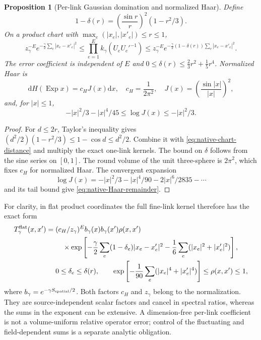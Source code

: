 \documentclass[11pt,oneside,openany]{book}
\newtheorem{proposition}[proposition]{Proposition}
\theoremstyle{definition}
\theoremstyle{remark}
\newcommand{\dd}{\mathrm d}
\begin{document}
\begin{proposition}[Per-link Gaussian domination and normalized Haar]
\label{prop:native-supnorm-kernel}
Define
\[
 1-\delta(r)=\left(\frac{\sin r}{r}\right)^2(1-r^2/3).
\]
On a product chart with $\max_e(|x_e|,|x'_e|)\le r\le1$,
\begin{equation}
 z_\gamma^{-E}e^{-\frac\gamma2\sum_e|x_e-x'_e|^2}
 \le\prod_{e=1}^E k_\gamma(U_eU_e'^{-1})
 \le z_\gamma^{-E}
            e^{-\frac\gamma2(1-\delta(r))\sum_e|x_e-x'_e|^2}.
 \label{eq:native-supnorm-sandwich}
\end{equation}
The error coefficient is independent of $E$ and
$0\le\delta(r)\le\tfrac23r^2+\tfrac15r^4$. Normalized Haar is
\begin{equation}
 \dd H(\operatorname{Exp}x)=c_HJ(x)\dd x,\quad
 c_H=\frac1{2\pi^2},\quad
 J(x)=\left(\frac{\sin|x|}{|x|}\right)^2,
 \label{eq:native-normalized-Haar}
\end{equation}
and, for $|x|\le1$,
\begin{equation}
 -|x|^2/3-|x|^4/45\le\log J(x)\le-|x|^2/3.
 \label{eq:native-Haar-remainder}
\end{equation}
\end{proposition}
\begin{proof}
For $d\le2r$, Taylor's inequality gives
$(d^2/2)(1-r^2/3)\le1-\cos d\le d^2/2$.
Combine it with \cref{eq:native-chart-distance} and multiply the exact
one-link kernels. The bound on $\delta$ follows from the sine series
on $[0,1]$. The round volume of the unit three-sphere is $2\pi^2$,
which fixes $c_H$ for normalized Haar. The convergent expansion
\[
 \log J(x)=-|x|^2/3-|x|^4/90-2|x|^6/2835-\cdots
\]
and its tail bound give \cref{eq:native-Haar-remainder}.
\end{proof}

For clarity, in flat product coordinates the full fine-link kernel
therefore has the exact form
\begin{align}
 T_\gamma^{\rm flat}(x,x')
 ={}&(c_H/z_\gamma)^E b_\gamma(x)b_\gamma(x')\rho(x,x')\notag\\
 &\quad\times\exp\left[-\frac\gamma2\sum_e(1-\delta_e)|x_e-x'_e|^2
                     -\frac16\sum_e(|x_e|^2+|x'_e|^2)\right],\notag\\
 &0\le\delta_e\le\delta(r),\qquad
 \exp\left[-\frac1{90}\sum_e(|x_e|^4+|x'_e|^4)\right]
                      \le\rho(x,x')\le1,
 \label{eq:native-flat-factorization}
\end{align}
where $b_\gamma=e^{-\gamma S_{\rm spatial}/2}$. Both factors
$c_H$ and $z_\gamma$ belong to the normalization. They are
source-independent scalar factors and cancel in spectral ratios,
whereas the sums in the exponent can be extensive. A dimension-free
per-link coefficient is not a volume-uniform relative operator error;
control of the fluctuating and field-dependent sums is a separate
analytic obligation.
\end{document}
